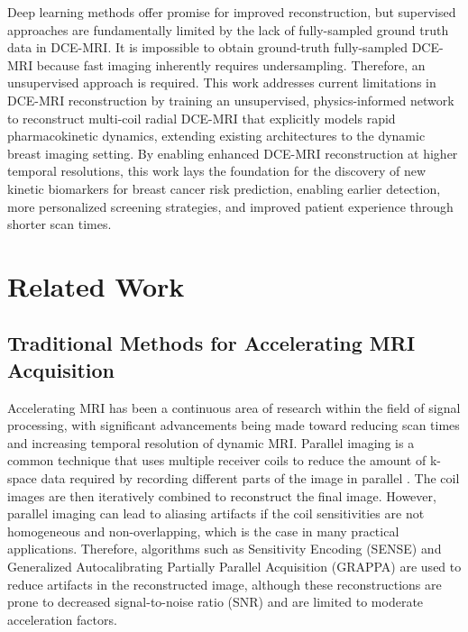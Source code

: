 \documentclass[runningheads]{llncs}
\begin{document}
Deep learning methods offer promise for improved reconstruction, but supervised approaches are fundamentally limited by the lack of fully-sampled ground truth data in DCE-MRI. It is impossible to obtain ground-truth fully-sampled DCE-MRI because fast imaging inherently requires undersampling. Therefore, an unsupervised approach is required. This work addresses current limitations in DCE-MRI reconstruction by training an unsupervised, physics-informed network to reconstruct multi-coil radial DCE-MRI that explicitly models rapid pharmacokinetic dynamics, extending existing architectures to the dynamic breast imaging setting. By enabling enhanced DCE-MRI reconstruction at higher temporal resolutions, this work lays the foundation for the discovery of new kinetic biomarkers for breast cancer risk prediction, enabling earlier detection, more personalized screening strategies, and improved patient experience through shorter scan times. 

\section{Related Work}

\subsection{Traditional Methods for Accelerating MRI Acquisition}

Accelerating MRI has been a continuous area of research within the field of signal processing, with significant advancements being made toward reducing scan times and increasing temporal resolution of dynamic MRI. Parallel imaging is a common technique that uses multiple receiver coils to reduce the amount of k-space data required by recording different parts of the image in parallel \cite{Deshmane2012Parallel}. The coil images are then iteratively combined to reconstruct the final image. However, parallel imaging can lead to aliasing artifacts if the coil sensitivities are not homogeneous and non-overlapping, which is the case in many practical applications. Therefore, algorithms such as Sensitivity Encoding (SENSE) \cite{Pruessmann1999SENSE} and Generalized Autocalibrating Partially Parallel Acquisition (GRAPPA) \cite{Griswold2002GRAPPA} are used to reduce artifacts in the reconstructed image, although these reconstructions are prone to decreased signal-to-noise ratio (SNR) and are limited to moderate acceleration factors. 
\end{document}
